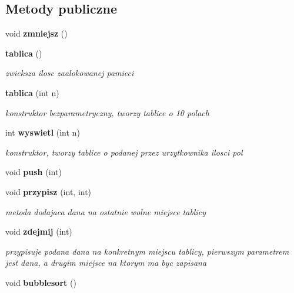 \subsection*{Metody publiczne}
\begin{DoxyCompactItemize}
\item 
void {\bfseries zmniejsz} ()\label{classtablica_a5e2094ab2deb4aca91905f96e0f01b08}

\item 
{\bf tablica} ()\label{classtablica_abc5414ba4d6321ecf744e38a809d9c8f}

\begin{DoxyCompactList}\small\item\em zwieksza ilosc zaalokowanej pamieci \end{DoxyCompactList}\item 
{\bf tablica} (int n)\label{classtablica_a5ee1754d39209bec5987d4cbdf19f210}

\begin{DoxyCompactList}\small\item\em konstruktor bezparametryczny, tworzy tablice o 10 polach \end{DoxyCompactList}\item 
int {\bf wyswietl} (int n)\label{classtablica_a0c9c746af292f75af844cdd803306fed}

\begin{DoxyCompactList}\small\item\em konstruktor, tworzy tablice o podanej przez urzytkownika ilosci pol \end{DoxyCompactList}\item 
void {\bfseries push} (int)\label{classtablica_aa558871f57e678103d92b4038c58623f}

\item 
void {\bf przypisz} (int, int)\label{classtablica_af615accc61dcccf729ea5f31f03c34e2}

\begin{DoxyCompactList}\small\item\em metoda dodajaca dana na ostatnie wolne miejsce tablicy \end{DoxyCompactList}\item 
void {\bf zdejmij} (int)\label{classtablica_aaab8198682dc839a3e99d2fe9a7ae83c}

\begin{DoxyCompactList}\small\item\em przypisuje podana dana na konkretnym miejscu tablicy, pierwszym parametrem jest dana, a drugim miejsce na ktorym ma byc zapisana \end{DoxyCompactList}\item 
void {\bf bubblesort} ()\label{classtablica_aad9a923a9ce031b2ecb6ae85645f4393}


\end{DoxyCompactItemize}
